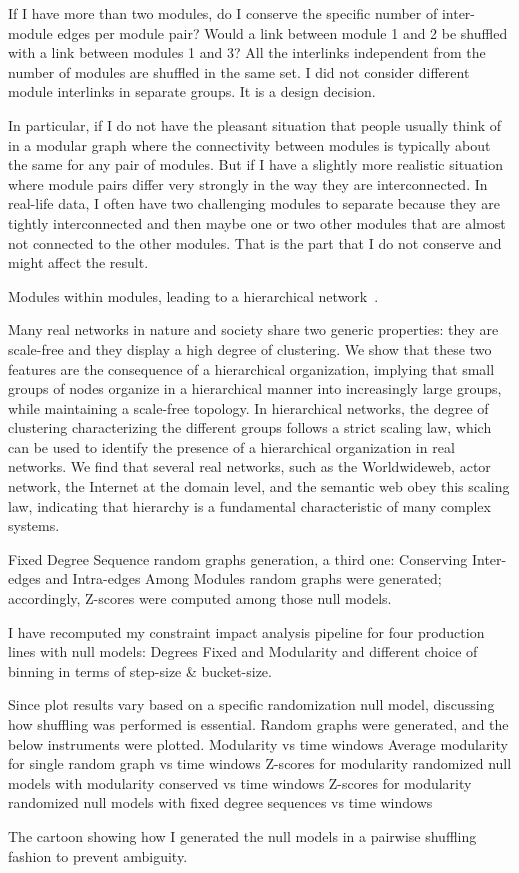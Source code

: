 {\color{red} 
	If I have more than two modules, do I conserve the specific number of inter-module edges per module pair? Would a link between module 1 and 2 be shuffled with a link between modules 1 and 3? 
	All the interlinks independent from the number of modules are shuffled in the same set. I did not consider different module interlinks in separate groups. It is a design decision.
	
	In particular, if I do not have the pleasant situation that people usually think of in a modular graph where the connectivity between modules is typically about the same for any pair of modules. But if I have a slightly more realistic situation where module pairs differ very strongly in the way they are interconnected. In real-life data, I often have two challenging modules to separate because they are tightly interconnected and then maybe one or two other modules that are almost not connected to the other modules. That is the part that I do not conserve and might affect the result.
	
	Modules within modules, leading to a hierarchical network~\cite{Hutt2008}.
	
	Many real networks in nature and society share two generic properties: they are scale-free and they display a high degree of clustering. We show that these two features are the consequence of a hierarchical organization, implying that small groups of nodes organize in a hierarchical manner into increasingly large groups, while maintaining a scale-free topology. In hierarchical networks, the degree of clustering characterizing the different groups follows a strict scaling law, which can be used to identify the presence of a hierarchical organization in real networks. We find that several real networks, such as the Worldwideweb, actor network, the Internet at the domain level, and the semantic web obey this scaling law, indicating that hierarchy is a fundamental characteristic of many complex systems.~\cite{Barabasi2003}
	
	Fixed Degree Sequence random graphs generation, a third one: Conserving Inter-edges and Intra-edges Among Modules random graphs were generated; accordingly, Z-scores were computed among those null models.
	
	I have recomputed my constraint impact analysis pipeline for four production lines with null models: Degrees Fixed and Modularity and different choice of binning in terms of step-size \& bucket-size.
	
	Since plot results vary based on a specific randomization null model, discussing how shuffling was performed is essential. 
	Random graphs were generated, and the below instruments were plotted.
	Modularity vs time windows
	Average modularity for single random graph vs time windows
	Z-scores for modularity randomized null models with modularity conserved vs time windows
	Z-scores for modularity randomized null models with fixed degree sequences vs time windows
		
	The cartoon showing how I generated the null models in a pairwise shuffling fashion to prevent ambiguity.}

